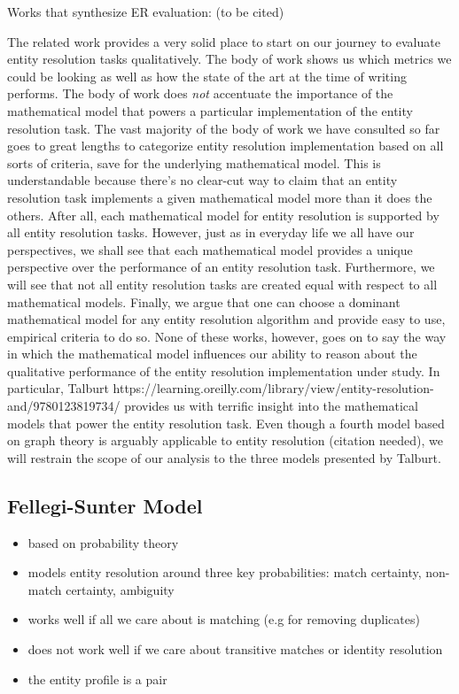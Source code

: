 \documentclass[11pt]{article}
\begin{document}
    Works that synthesize ER evaluation: (to be cited)

    The related work provides a very solid place to start on our journey to evaluate entity resolution tasks
    qualitatively.
    The body of work shows us which metrics we could be looking as well as how the state of the art at the time of
    writing performs.
    The body of work does \textit{not} accentuate the importance of the mathematical model that powers a particular
    implementation of the entity resolution task.
    The vast majority of the body of work we have consulted so far goes to great lengths to categorize entity resolution
    implementation based on all sorts of criteria, save for the underlying mathematical model.
    This is understandable because there's no clear-cut way to claim that an entity resolution task implements a given
    mathematical model more than it does the others.
    After all, each mathematical model for entity resolution is supported by all entity resolution tasks.
    However, just as in everyday life we all have our perspectives, we shall see that each mathematical model provides a
    unique perspective over the performance of an entity resolution task.
    Furthermore, we will see that not all entity resolution tasks are created equal with respect to all mathematical
    models.
    Finally, we argue that one can choose a dominant mathematical model for any entity resolution algorithm and provide
    easy to use, empirical criteria to do so.
    None of these works, however, goes on to say the way in which the mathematical model influences our ability to
    reason about the qualitative performance of the entity resolution implementation under study.
    In particular, Talburt https://learning.oreilly.com/library/view/entity-resolution-and/9780123819734/
    provides us with terrific insight into the mathematical models that power the entity resolution task.
    Even though a fourth model based on graph theory is arguably applicable to entity resolution (citation needed), we
    will restrain the scope of our analysis to the three models presented by Talburt.

    \subsection[fsm]{Fellegi-Sunter Model}
    \begin{itemize}
        \item based on probability theory
        \item models entity resolution around three key probabilities: match certainty, non-match certainty, ambiguity
        \item works well if all we care about is matching (e.g for removing duplicates)
        \item does not work well if we care about transitive matches or identity resolution
        \item the entity profile is a pair
    \end{itemize}
\end{document}
